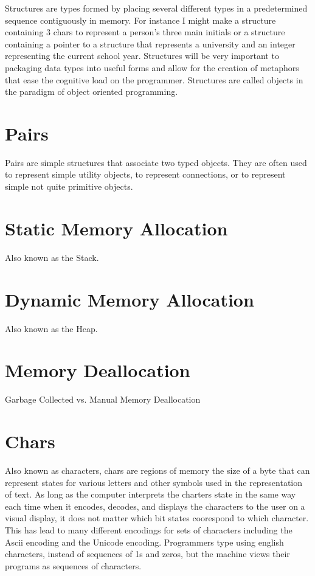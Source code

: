 \documentclass[12pt, letterpaper]{book}
\begin{document}
	Structures are types formed by placing several different types in a predetermined sequence contiguously in memory. For instance I might make a structure containing 3 chars to represent a person's three main initials or a structure containing a pointer to a structure that represents a university and an integer representing the current school year. Structures will be very important to packaging data types into useful forms and allow for the creation of metaphors that ease the cognitive load on the programmer. Structures are called objects in the paradigm of object oriented programming.

	\section{Pairs}

Pairs are simple structures that associate two typed objects. They are often used to represent simple utility objects, to represent connections, or to represent simple not quite primitive objects.

	\section{Static Memory Allocation} \label{static memory}

Also known as the Stack.

	\section{Dynamic Memory Allocation} \label{dynamic memory}

Also known as the Heap.
	\section[Memory Deallocation]{Memory Deallocation}

Garbage Collected vs. Manual Memory Deallocation

	\section{Chars}

	Also known as characters, chars are regions of memory the size of a byte that can represent states for various letters and other symbols used in the representation of text. As long as the computer interprets the charters state in the same way each time when it encodes, decodes, and displays the characters to the user on a visual display, it does not matter which bit states coorespond to which character. This has lead to many different encodings for sets of characters including the Ascii encoding and the Unicode encoding. Programmers type using english characters, instead of sequences of 1s and zeros, but the machine views their programs as sequences of characters.
\end{document}
